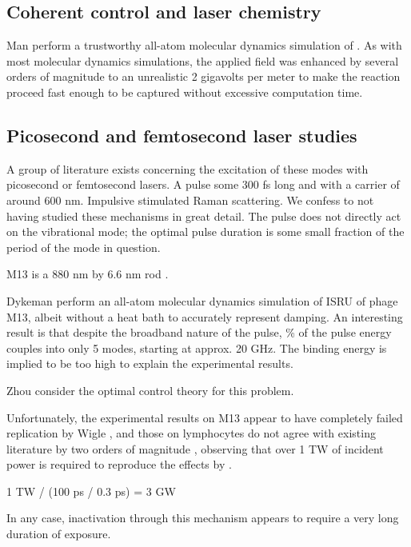 \documentclass[paper.tex]{subfiles}
\begin{document}
\begin{multicols}{1}
\subsection{Coherent control and laser chemistry}



Man \cite{Picosecond2016b} perform a trustworthy all-atom molecular dynamics simulation of . As with most molecular dynamics simulations, the applied field was enhanced by several orders of magnitude to an unrealistic 2 gigavolts per meter to make the reaction proceed fast enough to be captured without excessive computation time.



\subsection{Picosecond and femtosecond laser studies}

A group of literature exists concerning the excitation of these modes with picosecond or femtosecond lasers. A pulse some 300 fs long and with a carrier of around 600 nm. Impulsive stimulated Raman scattering. We confess to not having studied these mechanisms in great detail. The pulse does not directly act on the vibrational mode; the optimal pulse duration is some small fraction of the period of the mode in question.

M13 is a 880 nm by 6.6 nm rod \cite{M132015}. 

Dykeman \cite{Vibrational2009} perform an all-atom molecular dynamics simulation of ISRU of phage M13, albeit without a heat bath to accurately represent damping. An interesting result is that despite the broadband nature of the pulse, \% of the pulse energy couples into only 5 modes, starting at approx. 20 GHz. The binding energy is implied to be too high to explain the experimental results. 

Zhou \cite{Maximum2010} consider the optimal control theory for this problem. 

Unfortunately, the experimental results on M13 appear to have completely failed replication by Wigle \cite{No2011}, and those on lymphocytes do not agree with existing literature by two orders of magnitude \cite{Targeted2002}, observing that over 1 TW of incident power is required to reproduce the effects by . 

1 TW / (100 ps / 0.3 ps) = 3 GW 

In any case, inactivation through this mechanism appears to require a very long duration of exposure.





\end{multicols}
\end{document}
